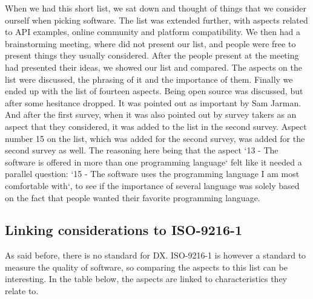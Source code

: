 \documentclass{article}
\begin{document}
When we had this short list, we sat down and thought of things that we
consider ourself when picking software. The list was extended further,
with aspects related to API examples, online community and platform compatibility.
We then had a brainstorming meeting, where did not present our list, and people
were free to present things they usually considered. After the people present
at the meeting had presented their ideas, we showed our list and compared.
The aspects on the list were discussed, the phrasing of it and the importance
of them. Finally we ended up with the list of fourteen aspects.
Being open source was discussed, but after some hesitance dropped. It
was pointed out as important by Sam Jarman. And after the first survey, when it was
also pointed out by survey takers as an aspect that they considered, it was
added to the list in the second survey.
Aspect number 15 on the list, which was added for the second survey, was
added for the second survey as well. The reasoning here being that the aspect
`13 - The software is offered in more than one programming language` felt
like it needed a parallel question: `15 - The software uses the programming language I am most comfortable with`,
to see if the importance of several language was solely based on the fact that
people wanted their favorite programming language.


\subsection{Linking considerations to ISO-9216-1}

As said before, there is no standard for DX. ISO-9216-1 is however a standard
to measure the quality of software, so comparing the aspects to this list can
be interesting. In the table below, the aspects are linked to characteristics they relate to.
\end{document}
